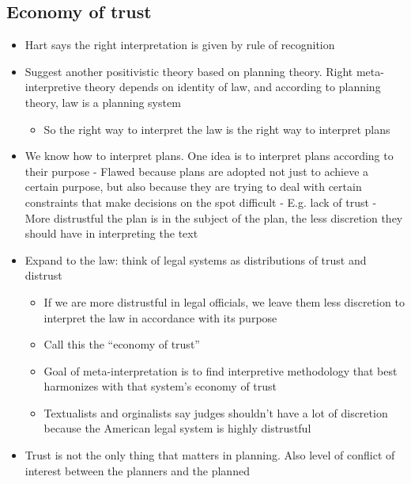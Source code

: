\hypertarget{economy-of-trust}{%
\subsection{Economy of trust}\label{economy-of-trust}}

\begin{itemize}
\tightlist
\item
  Hart says the right interpretation is given by rule of recognition
\item
  Suggest another positivistic theory based on planning theory. Right
  meta-interpretive theory depends on identity of law, and according to
  planning theory, law is a planning system

  \begin{itemize}
  \tightlist
  \item
    So the right way to interpret the law is the right way to interpret
    plans
  \end{itemize}
\item
  We know how to interpret plans. One idea is to interpret plans
  according to their purpose - Flawed because plans are adopted not just
  to achieve a certain purpose, but also because they are trying to deal
  with certain constraints that make decisions on the spot difficult -
  E.g. lack of trust - More distrustful the plan is in the subject of
  the plan, the less discretion they should have in interpreting the
  text
\item
  Expand to the law: think of legal systems as distributions of trust
  and distrust

  \begin{itemize}
  \tightlist
  \item
    If we are more distrustful in legal officials, we leave them less
    discretion to interpret the law in accordance with its purpose
  \item
    Call this the ``economy of trust''
  \item
    Goal of meta-interpretation is to find interpretive methodology that
    best harmonizes with that system's economy of trust
  \item
    Textualists and orginalists say judges shouldn't have a lot of
    discretion because the American legal system is highly distrustful
  \end{itemize}
\item
  Trust is not the only thing that matters in planning. Also level of
  conflict of interest between the planners and the planned


\end{itemize}
